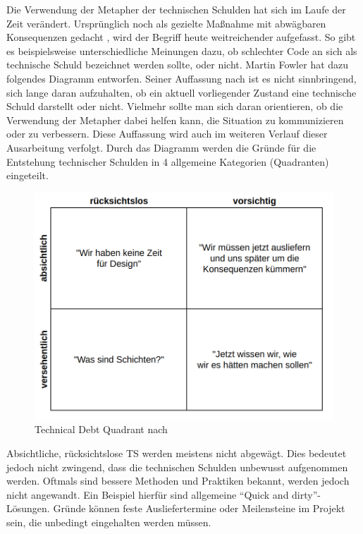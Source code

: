 \documentclass[acmtog]{acmart}
\begin{document}
Die Verwendung der Metapher der technischen Schulden hat sich im Laufe der
Zeit verändert. Ursprünglich noch als gezielte Maßnahme mit abwägbaren
Konsequenzen gedacht \cite{Tom13}, wird der Begriff heute weitreichender aufgefasst.
So gibt es beispielsweise unterschiedliche Meinungen dazu, ob schlechter Code
an sich als technische Schuld bezeichnet werden sollte, oder nicht. Martin
Fowler \cite{Fowler09} hat dazu folgendes Diagramm entworfen. Seiner Auffassung nach ist
es nicht sinnbringend, sich lange daran  aufzuhalten, ob ein aktuell
vorliegender Zustand eine technische Schuld darstellt oder nicht. Vielmehr
sollte man sich daran orientieren, ob die Verwendung der Metapher dabei helfen
kann, die Situation zu kommunizieren oder zu verbessern. Diese Auffassung wird
auch im weiteren Verlauf dieser Ausarbeitung verfolgt. Durch das Diagramm
werden die Gründe für die Entstehung technischer Schulden in 4 allgemeine
Kategorien (Quadranten) eingeteilt.

\begin{figure}[t]
  \centering
  \includegraphics[width=\linewidth]{images/Uebersetzung_TS_Quadrant.png}
  \caption{Technical Debt Quadrant nach \cite{Fowler09}}
  \label{fig:Quadrant_TS}
\end{figure}

Absichtliche, rücksichtslose TS werden meistens nicht abgewägt. Dies bedeutet
jedoch nicht zwingend, dass die technischen Schulden unbewusst aufgenommen
werden. Oftmals sind bessere Methoden und Praktiken bekannt, werden jedoch
nicht angewandt. Ein Beispiel hierfür sind allgemeine “Quick and dirty”-Lösungen.
Gründe können feste Ausliefertermine oder Meilensteine im Projekt sein, die
unbedingt eingehalten werden müssen.
\end{document}
